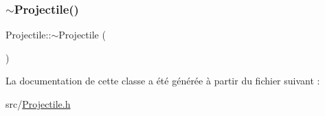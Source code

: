 \subsubsection{\texorpdfstring{$\sim$\+Projectile()}{~Projectile()}}
{\footnotesize\ttfamily Projectile\+::$\sim$\+Projectile (\begin{DoxyParamCaption}{ }\end{DoxyParamCaption})}



La documentation de cette classe a été générée à partir du fichier suivant \+:\begin{DoxyCompactItemize}
\item 
src/\hyperlink{_projectile_8h}{Projectile.\+h}\end{DoxyCompactItemize}
